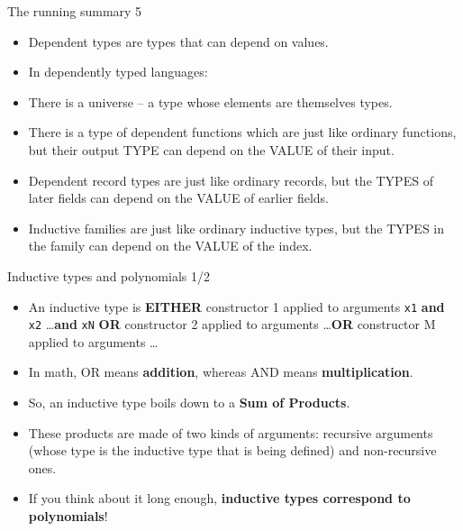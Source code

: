 \documentclass{beamer}
\newcommand{\m}[1]{\texttt{#1}}
\begin{document}
\begin{frame}{The running summary 5}
\begin{itemize}
	\item Dependent types are types that can depend on values.
	\item In dependently typed languages:
	\item There is a universe -- a type whose elements are themselves types.
	\item There is a type of dependent functions which are just like ordinary functions, but their output TYPE can depend on the VALUE of their input.
	\item Dependent record types are just like ordinary records, but the TYPES of later fields can depend on the VALUE of earlier fields.
	\item Inductive families are just like ordinary inductive types, but the TYPES in the family can depend on the VALUE of the index.
\end{itemize}
\end{frame}

\begin{frame}{Inductive types and polynomials 1/2}
\begin{itemize}
	\item An inductive type is \textbf{EITHER} constructor 1 applied to arguments \m{x1} \textbf{and} \m{x2} \dots \textbf{and} \m{xN} \textbf{OR} constructor 2 applied to arguments \dots \textbf{OR} constructor M applied to arguments \dots
	\item In math, OR means \textbf{addition}, whereas AND means \textbf{multiplication}.
	\item So, an inductive type boils down to a \textbf{Sum of Products}.
	\item These products are made of two kinds of arguments: recursive arguments (whose type is the inductive type that is being defined) and non-recursive ones.
	\item If you think about it long enough, \textbf{inductive types correspond to polynomials}!
\end{itemize}
\end{frame}
\end{document}
